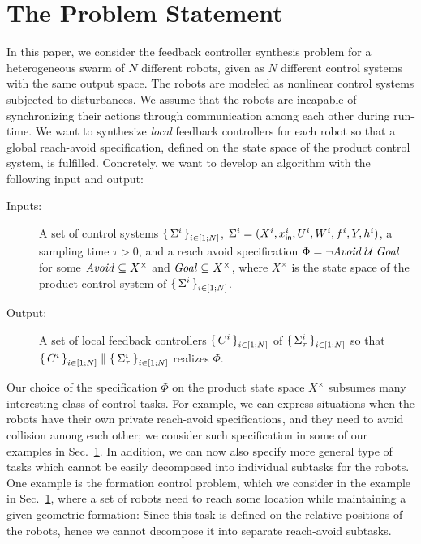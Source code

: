 
\section{The Problem Statement}
In this paper, we consider the feedback controller synthesis problem for a heterogeneous swarm of $N$ different robots, given as $N$ different control systems with the same output space.
The robots are modeled as nonlinear control systems subjected to disturbances.
We assume that the robots are incapable of synchronizing their actions through communication among each other during run-time.
We want to synthesize \emph{local} feedback controllers for each robot so that a global reach-avoid specification, defined on the state space of the product control system, is fulfilled.
Concretely, we want to develop an algorithm with the following input and output:
\begin{description}
	\item[Inputs:] A set of control systems $\set{\Sigma^i}_{i\in [1;N]}$, $\Sigma^i=(X^i,x_{\mathsf{in}}^i,U^i,W^i,f^i,Y,h^i)$, a sampling time $\tau >0$, and a reach avoid specification $\Phi=\lnot\mathit{Avoid}\;\mathcal{U}\;\mathit{Goal}$ for some $\mathit{Avoid}\subseteq X^\times$ and $\mathit{Goal}\subseteq X^\times$, where $X^\times$ is the state space of the product control system of $\set{\Sigma^i}_{i\in [1;N]}$.
	\item[Output:] A set of local feedback controllers $\set{C^i}_{i\in [1;N]}$ of $\set{\Sigma^i_\tau}_{i\in [1;N]}$ so that $\set{C^i}_{i\in [1;N]}\parallel \set{\Sigma_\tau^i}_{i\in [1;N]}$ realizes $\Phi$. 
\end{description}

Our choice of the specification $\Phi$ on the product state space $X^\times$ subsumes many interesting class of control tasks.
For example, we can express situations when the robots have their own private reach-avoid specifications, and they need to avoid collision among each other; we consider such specification in some of our examples in Sec.~\ref{}.
In addition, we can now also specify more general type of tasks which cannot be easily decomposed into individual subtasks for the robots.
One example is the formation control problem, which we consider in the example in Sec.~\ref{}, where a set of robots need to reach some location while maintaining a given geometric formation:
Since this task is defined on the relative positions of the robots, hence we cannot decompose it into separate reach-avoid subtasks.